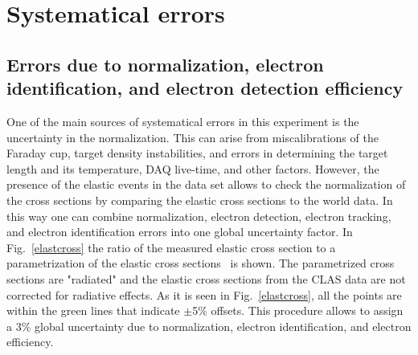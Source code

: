 \chapter{Systematical errors}


\section{Errors due to normalization, electron identification, and
 electron detection efficiency}
\label{syselectronid}



One of the main sources of systematical errors in this experiment is the uncertainty in the
normalization. This can arise from miscalibrations of the Faraday cup, target
density instabilities, and errors in
determining the target length and its
temperature, DAQ live-time, and other factors.
However, the presence of the elastic events
in the data set allows to check the
normalization of the cross sections by
comparing the elastic cross sections to the
world data. 
In this way one can combine normalization,
electron detection, electron tracking, and
electron identification errors into one
global uncertainty factor. In
Fig.~\ref{elastcross} the ratio of the measured
elastic cross section to a 
parametrization of the elastic
cross sections~\cite{Bosted:1994tm} is shown. The parametrized
cross sections are "radiated" and the
elastic cross sections from the CLAS data are
not corrected for radiative effects. As it is seen in  Fig.~\ref{elastcross}, all the points are within
the green lines that indicate $\pm$5\% offsets. This
procedure allows to assign a 3\% global
uncertainty due to normalization,
electron identification, and electron
efficiency.

